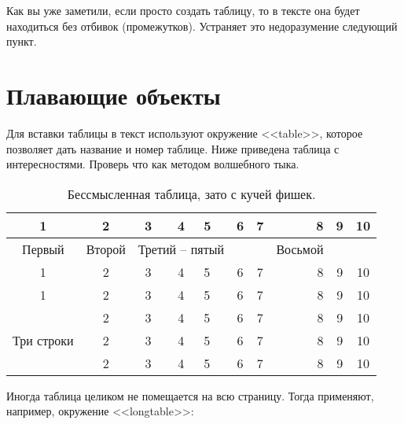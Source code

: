 \documentclass[a4paper,12pt]{article} %
\begin{document}
Как вы уже заметили, если просто создать таблицу, то в тексте она будет находиться без отбивок (промежутков). Устраняет это недоразумение следующий пункт.

\newpage

\section{Плавающие объекты}

Для вставки таблицы в текст используют окружение <<table>>, которое позволяет дать название и номер таблице. Ниже приведена таблица с интересностями. Проверь что как методом волшебного тыка.

\begin{table}[h!] 
	\begin{center} %
		\caption[Заголовок для списка таблиц]{Бессмысленная таблица, зато с кучей фишек.}\label{tab:mytab}
		\begin{tabular}{|c|c|c|c||l|c|c|r|c|c|}
			\hline
			1 & 2 & 3 & 4 & 5 & 6 & 7 & 8 & 9 & 10 \\ \hline
			Первый & Второй & \multicolumn{3}{|c|}{Третий -- пятый} &   &  & Восьмой &   &\\ 
			\cline{1-7} \cline{9-10}
			1 & 2 & 3 & 4 & 5 & 6 & 7 & 8 & 9 & 10 \\ \hline \hline
			1 & 2 & 3 & 4 & 5 & 6 & 7 & 8 & 9 & 10 \\ \hline
			\multirow{3}{*}{Три строки}  & 2 & 3 & 4 & 5 & 6 & 7 & 8 & 9 & 10 \\ \cline{2-10} %
			& 2 & 3 & 4 & 5 & 6 & 7 & 8 & 9 & 10 \\ \cline{2-10}
			& 2 & 3 & 4 & 5 & 6 & 7 & 8 & 9 & 10 \\ \hline
		\end{tabular}
	\end{center}
\end{table}


Иногда таблица целиком не помещается на всю страницу. Тогда применяют, например, окружение <<longtable>>:
\end{document}
